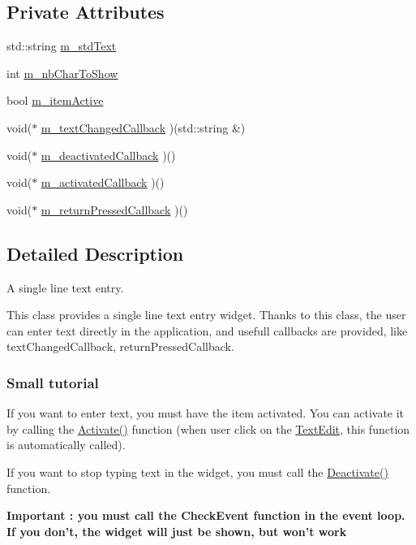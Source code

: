 \subsection*{Private Attributes}
\begin{CompactItemize}
\item 
std::string \hyperlink{classsfgui_1_1TextEdit_08de851a32aa8dd650e33dfcb376bfd8}{m\_\-stdText}
\item 
int \hyperlink{classsfgui_1_1TextEdit_648ee4daef549d909bef251aa2f12b40}{m\_\-nbCharToShow}
\item 
bool \hyperlink{classsfgui_1_1TextEdit_8ffa5546b2fd4901837b13a118f9beef}{m\_\-itemActive}
\item 
void($\ast$ \hyperlink{classsfgui_1_1TextEdit_a6d415ef1daf7f9fdf0dec3d71cb8eab}{m\_\-textChangedCallback} )(std::string \&)
\item 
void($\ast$ \hyperlink{classsfgui_1_1TextEdit_bfa97d7c95f54cc91600375242fe1ea6}{m\_\-deactivatedCallback} )()
\item 
void($\ast$ \hyperlink{classsfgui_1_1TextEdit_9cf910f9fca635f595d6a8963d7e30d1}{m\_\-activatedCallback} )()
\item 
void($\ast$ \hyperlink{classsfgui_1_1TextEdit_d86f9eaadf1313214631b2de009abf55}{m\_\-returnPressedCallback} )()
\end{CompactItemize}


\subsection{Detailed Description}
A single line text entry. 

This class provides a single line text entry widget. Thanks to this class, the user can enter text directly in the application, and usefull callbacks are provided, like textChangedCallback, returnPressedCallback.

\subsubsection*{Small tutorial}

If you want to enter text, you must have the item activated. You can activate it by calling the \hyperlink{classsfgui_1_1TextEdit_bcd256e053ae8f13a5c7f919f79c03c9}{Activate()} function (when user click on the \hyperlink{classsfgui_1_1TextEdit}{TextEdit}, this function is automatically called). \par
 If you want to stop typing text in the widget, you must call the \hyperlink{classsfgui_1_1TextEdit_49b0919fd6c43c35913f8a46a6788270}{Deactivate()} function. \par
 {\bf Important : you must call the CheckEvent function in the event loop. If you don't, the widget will just be shown, but won't work} 

